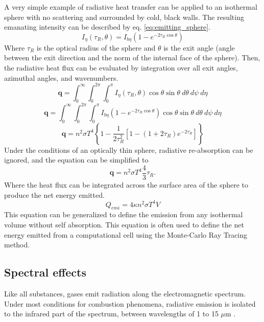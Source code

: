 A very simple example of radiative heat transfer can be applied to an isothermal sphere with no scattering and surrounded by cold, black walls. 
The resulting emanating intensity can be described by eq. \ref{eq:emitting_sphere}.
\begin{equation}
    I_\eta{}(\tau{}_R,\theta{}) = I_{b\eta{}}\left(1-e^{-2\tau{}_R\cos{\theta}}\right)
    \label{eq:emitting_sphere}
\end{equation}
Where $\tau{}_R$ is the optical radius of the sphere and $\theta{}$ is the exit angle (angle between the exit direction and the norm of the internal face of the sphere).
Then, the radiative heat flux can be evaluated by integration over all exit angles, azimuthal angles, and wavenumbers.
\begin{equation}
    \textbf{q}=\int_0^\infty{}\int_0^{2\pi}\int_0^{\pi{}}I_\eta{}(\tau{}_R,\theta)\cos{\theta}\sin{\theta}~d\theta{}~d\psi{}~d\eta{}
    \label{eq:heatflux}
\end{equation}
\begin{equation}
    \textbf{q}=\int_0^\infty{}\int_0^{2\pi}\int_0^{\pi{}}I_{b\eta{}}\left(1-e^{-2\tau{}_R\cos{\theta}}\right)\cos{\theta}\sin{\theta}~d\theta{}~d\psi{}~d\eta{}
    \label{eq:heatflux}
\end{equation}
\begin{equation}
    \textbf{q}=n^2\sigma{}T^4\left\{1-\frac{1}{2\tau{}_R^2}\left[1-(1+2\tau{}_R)e^{-2\tau{}_R}\right]\right\}
    \label{eq:heatflux}
\end{equation}
Under the conditions of an optically thin sphere, radiative re-absorption can be ignored, and the equation can be simplified to
\begin{equation}
    \textbf{q}=n^2\sigma{}T^4\frac{4}{3}\tau{}_R.
    \label{eq:heatflux}
\end{equation}
Where the heat flux can be integrated across the surface area of the sphere to produce the net energy emitted.
\begin{equation}
    Q_{emi}=4\kappa{}n^2\sigma{}T^4V
    \label{eq:heatflux}
\end{equation}
This equation can be generalized to define the emission from any isothermal volume without self absorption.
This equation is often used to define the net energy emitted from a computational cell using the Monte-Carlo Ray Tracing method.

\subsection{Spectral effects}\label{Sec:Nongray}
Like all substances, gases emit radiation along the electromagnetic spectrum. Under most conditions for combustion phenomena, radiative emission is isolated to the infrared part of the spectrum, between wavelengths of 1 to 15 $\mu{}$m \cite{Liu2020TheFlames}.

